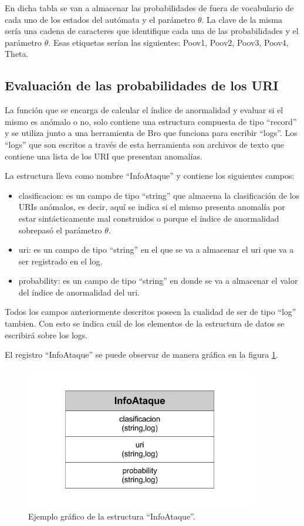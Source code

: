 En dicha tabla se van a almacenar las probabilidades de fuera de vocabulario de cada uno de los estados del autómata y el parámetro $\theta$. La clave de la misma sería una cadena de caracteres que identifique cada una de las probabilidades  y el parámetro  $\theta$. Esas etiquetas serían las siguientes: Poov1, Poov2, Poov3, Poov4, Theta.  

\subsection*{Evaluación de las probabilidades de los URI}
\label{sssec:estructuraEvaluacion}

La función  que se encarga de calcular el índice de anormalidad  y evaluar si el mismo es anómalo o no, solo contiene una estructura compuesta de tipo ``record'' y se utiliza junto a una herramienta de Bro que funciona para escribir ``logs''. Los ``logs'' que son escritos a través de esta herramienta son archivos de texto que contiene una lista de los URI que presentan anomalías.

La estructura lleva como nombre ``InfoAtaque'' y contiene los siguientes campos:

\begin{itemize}
\item clasificacion: es un campo de tipo ``string'' que almacena la clasificación de los URIs anómalos, es decir, aquí se indica si el mismo presenta anomalía por estar sintácticamente mal construidos o porque el índice de anormalidad sobrepasó el parámetro $\theta$.
\item uri: es un campo de tipo ``string'' en el que se va a almacenar el uri que va a ser registrado en el log.
\item probability: es un campo de tipo ``string'' en donde se va a almacenar el valor del índice de anormalidad del uri.
\end{itemize}

Todos los campos anteriormente descritos poseen la cualidad de ser de tipo ``log'' tambien. Con esto se indica cuál de los elementos de la estructura de datos se escribirá sobre los logs.

    El registro ``InfoAtaque'' se puede observar de manera gráfica en la figura \ref{fig:InfoAtaque}. 
    
\begin{figure}[!htb]
\begin{center}
\includegraphics[width=4in]{./img/InfoAtaque.jpg}
\caption{Ejemplo gráfico de la estructura ``InfoAtaque''.}
\label{fig:InfoAtaque}
\end{center}
\end{figure}	

